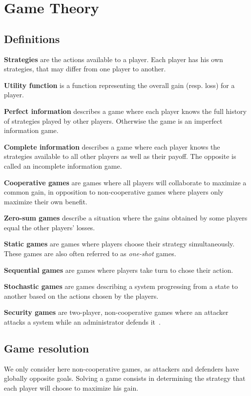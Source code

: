 \chapter{Game Theory}
\label{sec:appendixgt}
\section{Definitions}
\textbf{Strategies} are the actions available to a player. Each player has his own strategies, that may differ from one player to another.

\textbf{Utility function} is a function representing the overall gain (resp. loss) for a player.

\textbf{Perfect information} describes a game where each player knows the full history of strategies played by other players. Otherwise the game is an imperfect information game.

\textbf{Complete information} describes a game where each player knows the strategies available to all other players as well as their payoff. The opposite is called an incomplete information game.

\textbf{Cooperative games} are games where all players will collaborate to maximize a common gain, in opposition to non-cooperative games where players only maximize their own benefit.

\textbf{Zero-sum games} describe a situation where the gains obtained by some players equal the other players' losses.

\textbf{Static games} are games where players choose their strategy simultaneously. These games are also often referred to as \textit{one-shot} games.

\textbf{Sequential games} are games where players take turn to chose their action.

\textbf{Stochastic games} are games describing a system progressing from a state to another based on the actions chosen by the players.

\textbf{Security games} are two-player, non-cooperative games where an attacker attacks a system while an administrator defends it~\cite{book-gt}.

\section{Game resolution}
We only consider here non-cooperative games, as attackers and defenders have globally opposite goals.
Solving a game consists in determining the strategy that each player will choose to maximize his gain.

